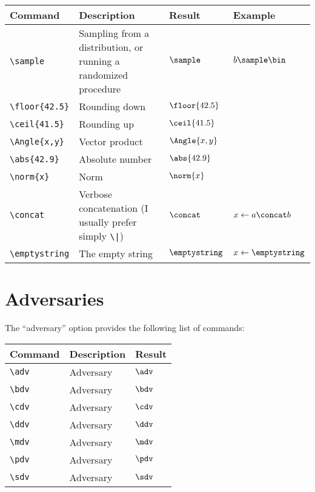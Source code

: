 \documentclass[a4paper]{report}
\begin{document}
  \begin{center}
  \begin{tabular}{l p{6cm} l l}
  \textbf{Command} & \textbf{Description} & \textbf{Result} & \textbf{Example}  \\\hline
  \lstinline$\sample$ & Sampling from a distribution, or running a randomized procedure & $\sample$ & $b \sample \bin$ \\
  \lstinline$\floor{42.5}$ & Rounding down & $\floor{42.5}$ &  \\
  \lstinline$\ceil{41.5}$ & Rounding up & $\ceil{41.5}$ &  \\
  \lstinline$\Angle{x,y}$ & Vector product & $\Angle{x,y}$ &  \\
  \lstinline$\abs{42.9}$ & Absolute number & $\abs{42.9}$ &  \\
  \lstinline$\norm{x}$ & Norm & $\norm{x}$ & \\
  \lstinline$\concat$ & Verbose concatenation (I usually prefer simply \lstinline$\|$) & $\concat$ & $x \gets a\concat b$ \\
  \lstinline$\emptystring$ & The empty string & $\emptystring$ & $x \gets \emptystring$ 
  \end{tabular}
  \end{center}
  
  \section{Adversaries}
  The \enquote{adversary} option provides the following list of commands:
  
  \begin{center}
  \begin{tabular}{l l l}
  \textbf{Command} & \textbf{Description} & \textbf{Result} \\\hline
  \lstinline$\adv$ & Adversary & $\adv$  \\
  \lstinline$\bdv$ & Adversary & $\bdv$  \\
  \lstinline$\cdv$ & Adversary & $\cdv$  \\
  \lstinline$\ddv$ & Adversary & $\ddv$  \\
  \lstinline$\mdv$ & Adversary & $\mdv$  \\
  \lstinline$\pdv$ & Adversary & $\pdv$  \\
  \lstinline$\sdv$ & Adversary & $\sdv$  
  \end{tabular}
  \end{center}
  
\end{document}
